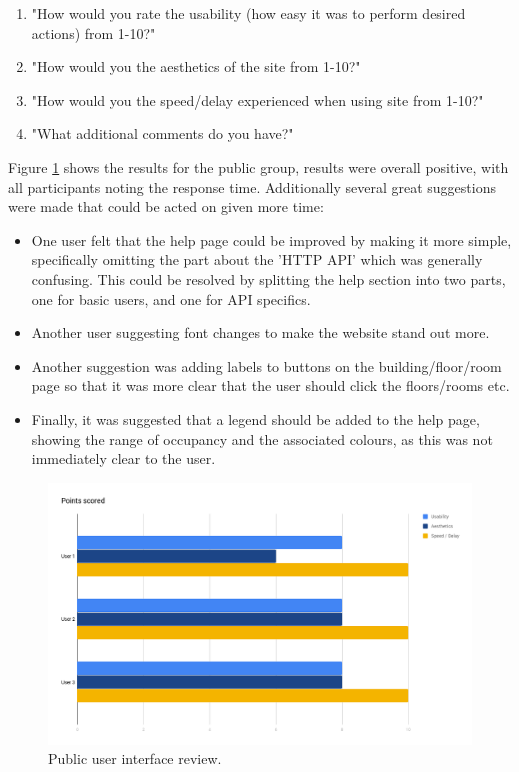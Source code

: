 \documentclass{l4proj}
\begin{document}
\begin{enumerate}	
  \item "How would you rate the usability (how easy it was to perform desired actions) from 1-10?"
  \item "How would you the aesthetics of the site from 1-10?"
  \item "How would you the speed/delay experienced when using site from 1-10?"
  \item "What additional comments do you have?"
\end{enumerate}

Figure \ref{fig:userrev} shows the results for the public group, results were overall positive, with all participants noting the response time. Additionally several great suggestions were made that could be acted on given more time:
\begin{itemize}	
  \item One user felt that the help page could be improved by making it more simple, specifically omitting the part about the 'HTTP API' which was generally confusing. This could be resolved by splitting the help section into two parts, one for basic users, and one for API specifics.
  \item Another user suggesting font changes to make the website stand out more.
  \item Another suggestion was adding labels to buttons on the building/floor/room page so that it was more clear that the user should click the floors/rooms etc.
  \item Finally, it was suggested that a legend should be added to the help page, showing the range of occupancy and the associated colours, as this was not immediately clear to the user.
\end{itemize}
	
\begin{figure}
\includegraphics[width=\textwidth]{userrev}
\caption{Public user interface review.}
\label{fig:userrev}
\end{figure}
\end{document}
